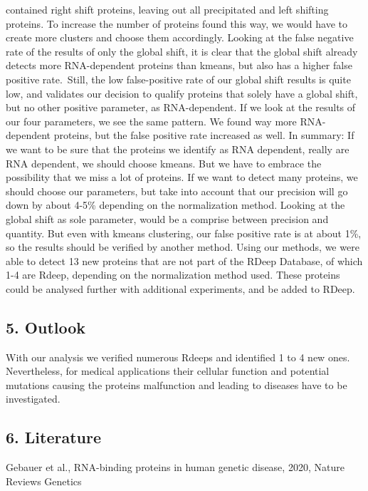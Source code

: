 \documentclass[
  12pt,
]{article}
\begin{document}
contained right shift proteins, leaving out all precipitated and left
shifting proteins. To increase the number of proteins found this way, we
would have to create more clusters and choose them accordingly. Looking
at the false negative rate of the results of only the global shift, it
is clear that the global shift already detects more RNA-dependent
proteins than kmeans, but also has a higher false positive rate.~Still,
the low false-positive rate of our global shift results is quite low,
and validates our decision to qualify proteins that solely have a global
shift, but no other positive parameter, as RNA-dependent. If we look at
the results of our four parameters, we see the same pattern. We found
way more RNA-dependent proteins, but the false positive rate increased
as well. In summary: If we want to be sure that the proteins we identify
as RNA dependent, really are RNA dependent, we should choose kmeans. But
we have to embrace the possibility that we miss a lot of proteins. If we
want to detect many proteins, we should choose our parameters, but take
into account that our precision will go down by about 4-5\% depending on
the normalization method. Looking at the global shift as sole parameter,
would be a comprise between precision and quantity. But even with kmeans
clustering, our false positive rate is at about 1\%, so the results
should be verified by another method. Using our methods, we were able to
detect 13 new proteins that are not part of the RDeep Database, of which
1-4 are Rdeep, depending on the normalization method used. These
proteins could be analysed further with additional experiments, and be
added to RDeep.

\hypertarget{outlook}{%
\subsection{5. Outlook}\label{outlook}}

With our analysis we verified numerous Rdeeps and identified 1 to 4 new
ones. Nevertheless, for medical applications their cellular function and
potential mutations causing the proteins malfunction and leading to
diseases have to be investigated.

\hypertarget{literature}{%
\subsection{6. Literature}\label{literature}}

Gebauer et al., RNA-binding proteins in human genetic disease, 2020,
Nature Reviews Genetics
\end{document}
